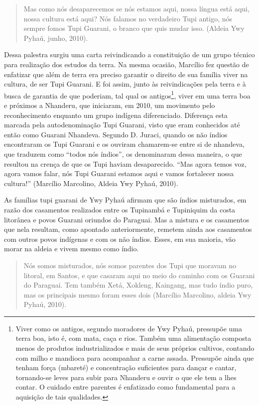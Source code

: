 \begin{quotation}
Mas como nós desaparecemos se nós estamos aqui, nossa língua está aqui,
nossa cultura está aqui? Nós falamos no verdadeiro Tupi antigo, nós
sempre fomos Tupi Guarani, o branco que quis mudar isso. (Aldeia Ywy
Pyhaú, junho, 2010).
\end{quotation}

Dessa palestra surgiu uma carta reivindicando a constituição de um grupo
técnico para realização dos estudos da terra. Na mesma ocasião,
Marcílio fez questão de enfatizar que além de terra era preciso
garantir o direito de sua família viver na cultura, de ser Tupi
Guarani. E foi assim, junto às reivindicações pela terra e à busca de
garantia de que poderiam, tal qual os antigos\footnote{Viver como os
antigos, segundo moradores de Ywy Pyhaú, pressupõe uma terra boa, isto
é, com mata, caça e rios. Também uma alimentação composta menos de
produtos industrializados e mais de seus próprios cultivos, contando
com milho e mandioca para acompanhar a carne assada. Pressupõe ainda
que tenham força (mbareté) e concentração suficientes para dançar e
cantar, tornando-se leves para subir para Nhanderu  e ouvir o que ele
tem a lhes contar. O cuidado entre parentes é enfatizado como
fundamental para a aquisição de tais qualidades.}, viver em uma terra
boa e próximos a Nhanderu, que iniciaram, em 2010, um movimento pelo
reconhecimento enquanto um grupo indígena diferenciado. Diferença esta
marcada pela autodenominação Tupi Guarani, visto que eram conhecidos
até então como Guarani Nhandeva. Segundo D. Juraci, quando os não
índios encontraram os Tupi Guarani e os ouviram chamarem-se entre si de
nhandeva, que traduzem como ``todos nós índios'', os denominaram dessa
maneira, o que resultou na crença de que os Tupi haviam desaparecido.
``Mas agora temos voz, agora vamos falar, nós Tupi Guarani estamos aqui
e vamos fortalecer nossa cultura!'' (Marcílio Marcolino, Aldeia Ywy
Pyhaú, 2010).

As famílias tupi guarani de Ywy Pyhaú afirmam que são índios misturados,
em razão dos casamentos realizados entre os Tupinambá e Tupiniquim da
costa litorânea e povos Guarani oriundos do Paraguai. Mas a mistura e
os casamentos que nela resultam, como apontado anteriormente, remetem
ainda aos casamentos com outros povos indígenas e com os não índios.
Esses, em sua maioria, vão morar na aldeia e vivem mesmo como índio.

\begin{quotation}
Nós somos misturados, nós somos parentes dos Tupi que moravam no
litoral, em Santos, e que casaram aqui no meio do caminho com os
Guarani do Paraguai. Tem também Xetá, Xokleng, Kaingang, mas tudo índio
puro, mas os principais mesmo foram esses dois (Marcílio Marcolino,
aldeia Ywy Pyhaú, 2010).
\end{quotation}

